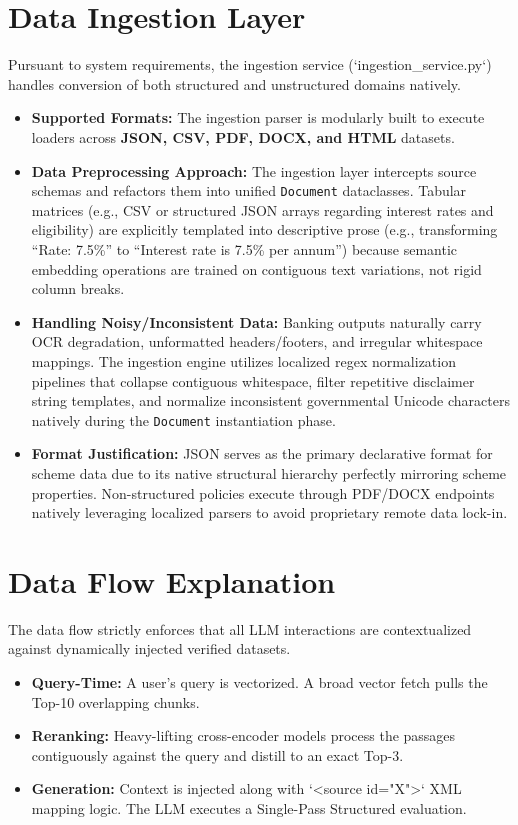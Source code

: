 \documentclass[11pt,a4paper]{article}
\begin{document}
\section{Data Ingestion Layer}
Pursuant to system requirements, the ingestion service (`ingestion\_service.py`) handles conversion of both structured and unstructured domains natively.
\begin{itemize}
    \item \textbf{Supported Formats:} The ingestion parser is modularly built to execute loaders across \textbf{JSON, CSV, PDF, DOCX, and HTML} datasets.
    \item \textbf{Data Preprocessing Approach:} The ingestion layer intercepts source schemas and refactors them into unified \texttt{Document} dataclasses. Tabular matrices (e.g., CSV or structured JSON arrays regarding interest rates and eligibility) are explicitly templated into descriptive prose (e.g., transforming ``Rate: 7.5\%'' to ``Interest rate is 7.5\% per annum'') because semantic embedding operations are trained on contiguous text variations, not rigid column breaks.
    \item \textbf{Handling Noisy/Inconsistent Data:} Banking outputs naturally carry OCR degradation, unformatted headers/footers, and irregular whitespace mappings. The ingestion engine utilizes localized regex normalization pipelines that collapse contiguous whitespace, filter repetitive disclaimer string templates, and normalize inconsistent governmental Unicode characters natively during the \texttt{Document} instantiation phase.
    \item \textbf{Format Justification:} JSON serves as the primary declarative format for scheme data due to its native structural hierarchy perfectly mirroring scheme properties. Non-structured policies execute through PDF/DOCX endpoints natively leveraging localized parsers to avoid proprietary remote data lock-in.
\end{itemize}

\section{Data Flow Explanation}
The data flow strictly enforces that all LLM interactions are contextualized against dynamically injected verified datasets.
\begin{itemize}
    \item \textbf{Query-Time:} A user's query is vectorized. A broad vector fetch pulls the Top-10 overlapping chunks. 
    \item \textbf{Reranking:} Heavy-lifting cross-encoder models process the passages contiguously against the query and distill to an exact Top-3.
    \item \textbf{Generation:} Context is injected along with `<source id="X">` XML mapping logic. The LLM executes a Single-Pass Structured evaluation.
\end{itemize}
\end{document}
